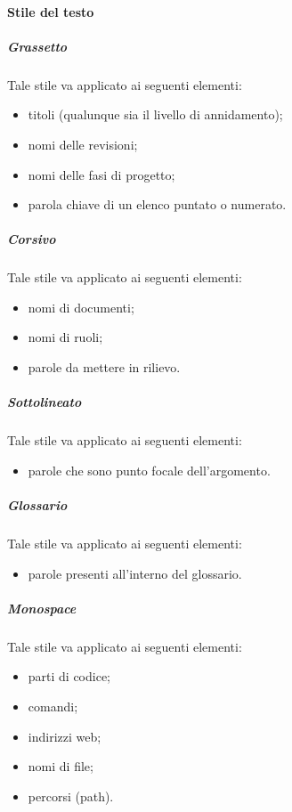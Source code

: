 			\paragraph{Stile del testo}
				\subparagraph{Grassetto}
					Tale stile va applicato ai seguenti elementi:
					\begin{itemize}
						\item titoli (qualunque sia il livello di annidamento);
						\item nomi delle revisioni;
						\item nomi delle fasi di progetto;
						\item parola chiave di un elenco puntato o numerato.
					\end{itemize}
				\subparagraph{Corsivo}
					Tale stile va applicato ai seguenti elementi:
					\begin{itemize}
						\item nomi di documenti;
						\item nomi di ruoli;
						\item parole da mettere in rilievo.
					\end{itemize}
				\subparagraph{Sottolineato}
					Tale stile va applicato ai seguenti elementi:
					\begin{itemize}
						\item parole che sono punto focale dell’argomento.
					\end{itemize}
				\subparagraph{Glossario}
					Tale stile va applicato ai seguenti elementi:
					\begin{itemize}
						\item parole presenti all’interno del glossario.
					\end{itemize}
				\subparagraph{Monospace}
					Tale stile va applicato ai seguenti elementi:
					\begin{itemize}
						\item parti di codice;
						\item comandi;
						\item indirizzi web;
						\item nomi di file;
						\item percorsi (path).
					\end{itemize}
